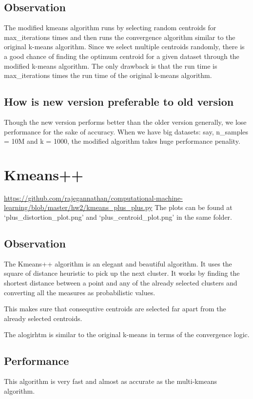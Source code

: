 \documentclass{article}
\begin{document}
       \subsection{Observation}
        The modified kmeans algorithm runs by selecting random centroids for max\_iterations times and then runs the convergence algorithm similar to the original k-means algorithm.  Since we select multiple centroids randomly, there is a good chance of finding the optimum centroid for a given dataset through the modified k-means algorithm.  The only drawback is that the run time is max\_iterations times the run time of the original k-means algorithm.
       \subsection{How is new version preferable to old version}
       Though the new version performs better than the older version generally, we lose performance for the sake of accuracy.  When we have big datasets: say, n\_samples = 10M and k = 1000, the  modified algorithm takes huge performance penality.

       \section{Kmeans++}
       \url{https://github.com/rajegannathan/computational-machine-learning/blob/master/hw2/kmeans_plus_plus.py}
       The plots can be found at `plus\_distortion\_plot.png' and `plus\_centroid\_plot.png' in the same folder.
       \subsection{Observation}
       The Kmeans++ algorithm is an elegant and beautiful algorithm.  It uses the square of distance heuristic to pick up the next cluster.  It works by finding the shortest distance between a point and any of the already selected clusters and converting all the measures as probabilistic values.

       This makes sure that consequtive centroids are selected far apart from the already selected centroids. 

       The alogirhtm is similar to the original k-means in terms of the convergence logic.
       \subsection{Performance}
       This algorithm is very fast and almost as accurate as the multi-kmeans algorithm.
\end{document}
